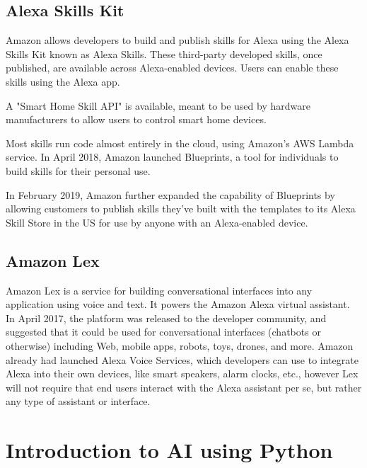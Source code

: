\documentclass[14pt,a4paper]{article}
\begin{document}
\subsection{Alexa Skills Kit}
\par Amazon allows developers to build and publish skills for Alexa using the Alexa Skills Kit known as Alexa Skills. These third-party developed skills, once published, are available across Alexa-enabled devices. Users can enable these skills using the Alexa app.
\par A "Smart Home Skill API" is available, meant to be used by hardware manufacturers to allow users to control smart home devices.
\par Most skills run code almost entirely in the cloud, using Amazon's AWS Lambda service.
In April 2018, Amazon launched Blueprints, a tool for individuals to build skills for their personal use.
\par In February 2019, Amazon further expanded the capability of Blueprints by allowing customers to publish skills they've built with the templates to its Alexa Skill Store in the US for use by anyone with an Alexa-enabled device.

\subsection{Amazon Lex}
\par Amazon Lex is a service for building conversational interfaces into any application using voice and text. It powers the Amazon Alexa virtual assistant. In April 2017, the platform was released to the developer community, and suggested that it could be used for conversational interfaces (chatbots or otherwise) including Web, mobile apps, robots, toys, drones, and more. Amazon already had launched Alexa Voice Services, which developers can use to integrate Alexa into their own devices, like smart speakers, alarm clocks, etc., however Lex will not require that end users interact with the Alexa assistant per se, but rather any type of assistant or interface.

\newpage
\section{Introduction to AI using Python}
\end{document}
